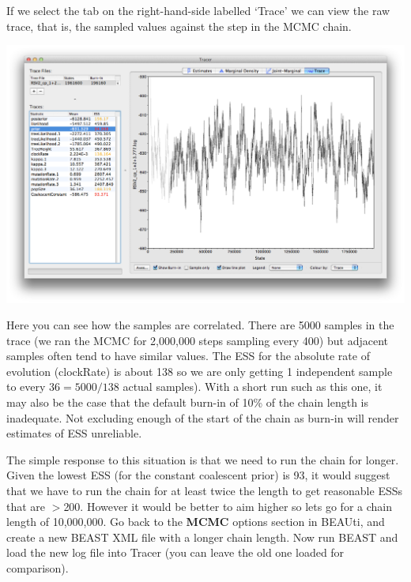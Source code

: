 \documentclass[12pt]{article}
\begin{document}
If we select the tab on the right-hand-side labelled `Trace' we can view the raw trace, that is, the sampled values against the step in the MCMC chain.

\medskip{}

\includegraphics[width=\textwidth]{figures/Tracer1}

\medskip{}

Here you can see how the samples are correlated. There are 5000 samples in the trace (we ran the MCMC for 2,000,000
steps sampling every 400) but adjacent samples often tend to have similar values. The ESS for the absolute rate of evolution (clockRate) is about 138 so we are only getting 1 independent sample to every $36=5000/138$ actual samples). With a short run such as this one, it may also be the case that the default burn-in of 10\% of the chain length is inadequate. Not excluding enough of the start of the chain as burn-in will render estimates of ESS unreliable.

The simple response to this situation is that we need to run the chain for longer. Given the lowest ESS (for the constant coalescent prior) is 93, it
would suggest that we have to run the chain for at least twice the length to get reasonable ESSs that are $>$200. However it would be better to aim
higher so lets go for a chain length of 10,000,000. Go back to the {\bf MCMC} options section in BEAUti, and create a new BEAST
XML file with a longer chain length. Now run BEAST and load the new log file into Tracer (you can leave the old one loaded
for comparison). 
\end{document}
